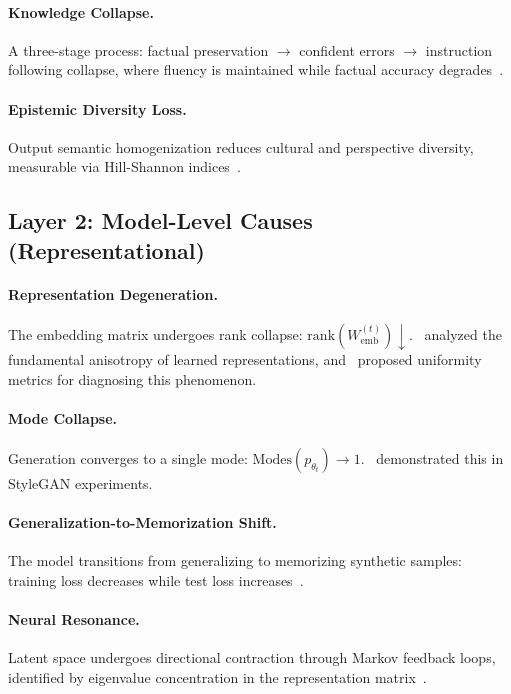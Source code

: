 \documentclass[11pt]{article}
\begin{document}
\paragraph{Knowledge Collapse.} A three-stage process: factual preservation $\to$ confident errors $\to$ instruction following collapse, where fluency is maintained while factual accuracy degrades~\citep{knowledge2025}.

\paragraph{Epistemic Diversity Loss.} Output semantic homogenization reduces cultural and perspective diversity, measurable via Hill-Shannon indices~\citep{epistemic2025}.

\subsection{Layer 2: Model-Level Causes (Representational)}
\label{sec:layer2}

\paragraph{Representation Degeneration.} The embedding matrix undergoes rank collapse: $\mathrm{rank}(W_{\mathrm{emb}}^{(t)}) \downarrow$.~\citet{jing2019understanding} analyzed the fundamental anisotropy of learned representations, and~\citet{wang2020understanding} proposed uniformity metrics for diagnosing this phenomenon.

\paragraph{Mode Collapse.} Generation converges to a single mode: $\mathrm{Modes}(p_{\theta_t}) \to 1$.~\citet{alemohammad2024self} demonstrated this in StyleGAN experiments.

\paragraph{Generalization-to-Memorization Shift.} The model transitions from generalizing to memorizing synthetic samples: training loss decreases while test loss increases~\citep{martinez2025closer}.

\paragraph{Neural Resonance.} Latent space undergoes directional contraction through Markov feedback loops, identified by eigenvalue concentration in the representation matrix~\citep{neural2026resonance}.
\end{document}
